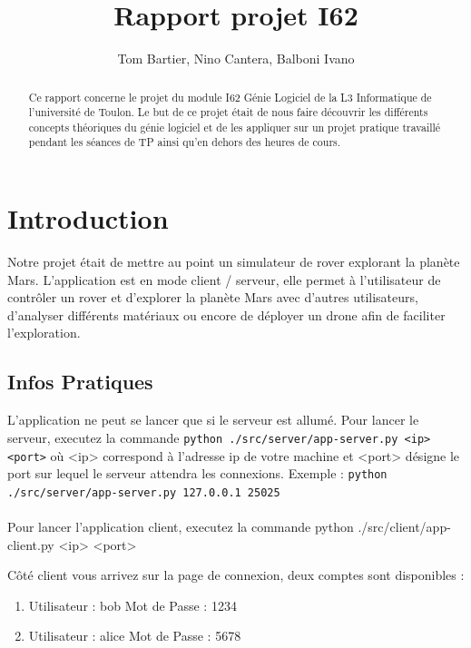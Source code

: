 \documentclass[12pt,a4paper]{scrartcl}
\title{Rapport projet I62}
\author{Tom Bartier, Nino Cantera, Balboni Ivano}
\begin{document}
\pagestyle{fancy}
\fancyhead{} %

\maketitle


\begin{abstract}
Ce rapport concerne le projet du module I62 Génie Logiciel de la L3 Informatique
de l'université de Toulon. Le but de ce projet était de nous faire découvrir
les différents concepts théoriques du génie logiciel et de les appliquer sur un projet
pratique travaillé pendant les séances de TP ainsi qu'en dehors des heures de cours.
\end{abstract}

\tableofcontents

\section {Introduction}

Notre projet était de mettre au point un simulateur de rover explorant la planète Mars.
L'application est en mode client / serveur, elle permet à l'utilisateur de contrôler un rover
et d'explorer la planète Mars avec d'autres utilisateurs, d'analyser différents matériaux
ou encore de déployer un drone afin de faciliter l'exploration.

\subsection{Infos Pratiques}
L'application ne peut se lancer que si le serveur est allumé.
Pour lancer le serveur, executez la commande \lstinline!python ./src/server/app-server.py <ip> <port>!
où <ip> correspond à l'adresse ip de votre machine et <port> désigne le port sur lequel le
serveur attendra les connexions. Exemple : \lstinline!python ./src/server/app-server.py 127.0.0.1 25025! \\\\
Pour lancer l'application client, executez la commande python ./src/client/app-client.py <ip> <port>

Côté client vous arrivez sur la page de connexion, deux comptes sont disponibles :
\begin{enumerate}
    \item Utilisateur : bob     Mot de Passe : 1234
    \item Utilisateur : alice   Mot de Passe : 5678
\end{enumerate}
\end{document}
